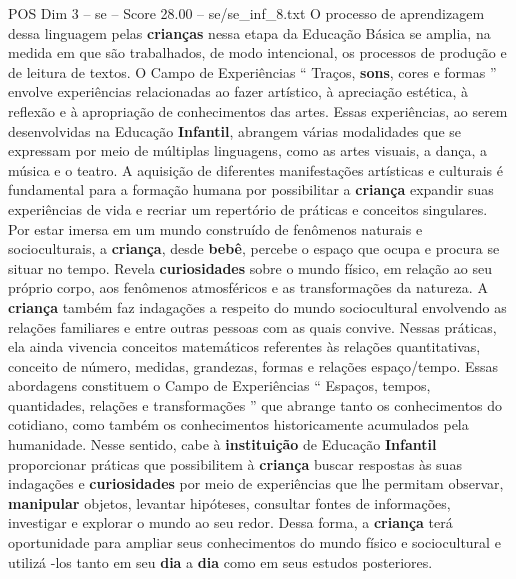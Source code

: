 \begin{textsample}{POS Dim 3 – se – Score 28.00 – se/se\_inf\_8.txt}
O processo de aprendizagem dessa linguagem pelas \textbf{crianças} nessa etapa da Educação Básica se amplia, na medida em que são trabalhados, de modo intencional, os processos de produção e de leitura de textos.
O Campo de Experiências “ Traços, \textbf{sons}, cores e formas ” envolve experiências relacionadas ao fazer artístico, à apreciação estética, à reflexão e à apropriação de conhecimentos das artes.
Essas experiências, ao serem desenvolvidas na Educação \textbf{Infantil}, abrangem várias modalidades que se expressam por meio de múltiplas linguagens, como as artes visuais, a dança, a música e o teatro.
A aquisição de diferentes manifestações artísticas e culturais é fundamental para a formação humana por possibilitar a \textbf{criança} expandir suas experiências de vida e recriar um repertório de práticas e conceitos singulares.
Por estar imersa em um mundo construído de fenômenos naturais e socioculturais, a \textbf{criança}, desde \textbf{bebê}, percebe o espaço que ocupa e procura se situar no tempo.
Revela \textbf{curiosidades} sobre o mundo físico, em relação ao seu próprio corpo, aos fenômenos atmosféricos e as transformações da natureza.
A \textbf{criança} também faz indagações a respeito do mundo sociocultural envolvendo as relações familiares e entre outras pessoas com as quais convive.
Nessas práticas, ela ainda vivencia conceitos matemáticos referentes às relações quantitativas, conceito de número, medidas, grandezas, formas e relações espaço/tempo.
Essas abordagens constituem o Campo de Experiências “ Espaços, tempos, quantidades, relações e transformações ” que abrange tanto os conhecimentos do cotidiano, como também os conhecimentos historicamente acumulados pela humanidade.
Nesse sentido, cabe à \textbf{instituição} de Educação \textbf{Infantil} proporcionar práticas que possibilitem à \textbf{criança} buscar respostas às suas indagações e \textbf{curiosidades} por meio de experiências que lhe permitam observar, \textbf{manipular} objetos, levantar hipóteses, consultar fontes de informações, investigar e explorar o mundo ao seu redor.
Dessa forma, a \textbf{criança} terá oportunidade para ampliar seus conhecimentos do mundo físico e sociocultural e utilizá -los tanto em seu \textbf{dia} a \textbf{dia} como em seus estudos posteriores.

\end{textsample}
